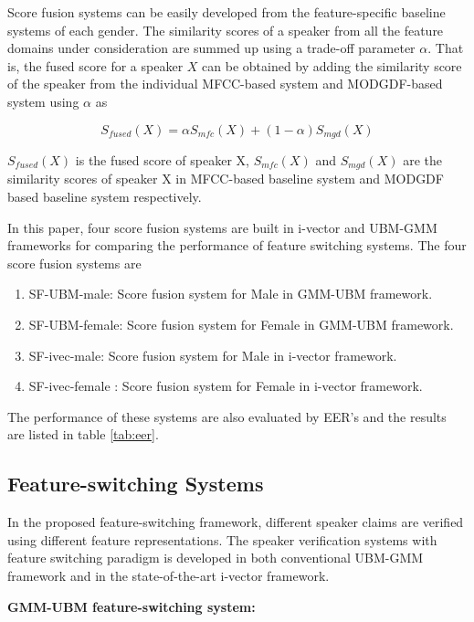 \documentclass{article}
\begin{document}
	Score fusion systems can be easily developed from the feature-specific baseline systems of each gender. The similarity scores of a speaker from all the feature domains under consideration are summed up using a trade-off parameter $\alpha$. That is, the fused score for a speaker $X$ can be obtained by adding the similarity score of the speaker from the individual MFCC-based system and MODGDF-based system using $\alpha$ as 
	
	\begin{equation}
	 S_{fused}\left( X \right) = \alpha S_{mfc}\left( X \right) + (1-\alpha)S_{mgd}\left( X \right)
	\label{eq:scoreFuse}
	\end{equation}
	
	$S_{fused}\left( X \right)$ is the fused score of speaker X,  $S_{mfc}\left( X \right)$ and $S_{mgd}\left( X \right)$ are the similarity scores of speaker X in MFCC-based baseline system and MODGDF based baseline system respectively.
	
	 
	In this paper, four score fusion systems are built in i-vector and UBM-GMM frameworks for comparing the performance of feature switching systems. The four score fusion systems are
	\begin{enumerate}
	\item SF-UBM-male: Score fusion system for Male in GMM-UBM framework.
	\item SF-UBM-female: Score fusion system for Female in GMM-UBM framework.
	\item SF-ivec-male: Score fusion system for Male in i-vector framework.
	\item SF-ivec-female	: Score fusion system for Female in i-vector framework.
	\end{enumerate}
	The performance of these systems are also evaluated by EER's and the results are listed in table \ref{tab:eer}.

\subsection{Feature-switching Systems}
\label{subsec:featSwitch}

In the proposed feature-switching framework, different speaker claims are verified using different feature representations. The speaker verification systems with feature switching paradigm is developed in both conventional UBM-GMM framework and in the state-of-the-art i-vector framework.

\textbf{GMM-UBM feature-switching system:}
\end{document}
